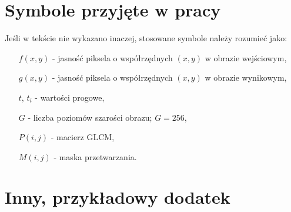 \chapter{Symbole przyjęte w pracy}
\label{app:symbole}

Jeśli w tekście nie wykazano inaczej, stosowane symbole należy rozumieć jako:

\begin{itemize}
\item[$f(x,y)$] - jasność piksela o współrzędnych $(x,y)$ w obrazie wejściowym,
\item[$g(x,y)$] - jasność piksela o współrzędnych $(x,y)$ w obrazie wynikowym,
\item[$t$, $t_i$] - wartości progowe,
\item[$G$] - liczba poziomów szarości obrazu; $G=256$,
\item[$P(i,j)$] - macierz GLCM,
\item[$M(i,j)$] - maska przetwarzania.
\end{itemize}


\chapter{Inny, przykładowy dodatek}
\label{app:dodatekPrzyklad}